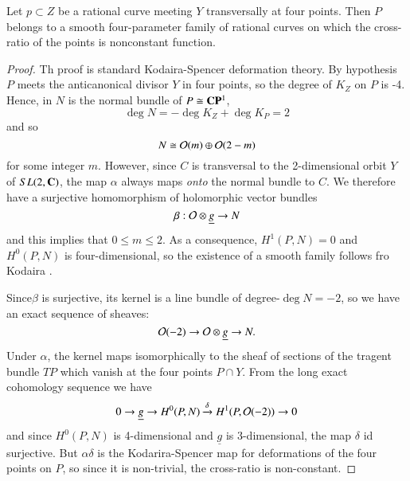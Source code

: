 \begin{proposition}\label{chap7-proposition-3}
Let $p \subset Z$ be a rational curve meeting $Y$ transversally at four points. Then $P$ belongs to a smooth four-parameter family of rational curves on which the cross-ratio of the points is nonconstant function.
\end{proposition}

\begin{proof}
Th proof is standard Kodaira-Spencer deformation theory. By hypothesis $P$ meets the anticanonical divisor $Y$ in four points, so the degree of $K_{Z}$ on $P$ is -4. Hence, in $N$ is the normal bundle of $P \cong \mathbf{C}\mathbf{P}^{1}$,
$$
\deg N = -\deg K_{Z} + \deg K_{P} = 2
$$
and so
$$
N \cong \mathcal{O}(m) \oplus \mathcal{O}(2-m)
$$
for some integer $m$. However, since $C$ is transversal to the 2-dimensional orbit $Y$ of $SL(2, \mathbf{C})$, the map $\alpha$ always maps \textit{onto} the normal bundle to $C$. We therefore have a surjective homomorphism of holomorphic vector bundles
$$
\beta : \mathcal{O} \otimes \underline{g} \rightarrow N
$$
and this implies that $ 0 \leq m \leq  2$. As a consequence, $H^{1} (P ,N) = 0$ and $H^{0}(P, N)$ is four-dimensional, so the existence of a smooth family follows fro  Kodaira \cite{chap7-key9}. 

Since\pageoriginale $\beta$ is surjective, its kernel is a line bundle of degree-$\deg N = -2$, so we have an exact sequence of sheaves:
$$
\mathcal{O}(-2)\rightarrow \mathcal{O} \otimes \underline{g}\rightarrow N.
$$
Under $\alpha$, the kernel maps isomorphically to the sheaf of sections of the tragent bundle $TP$ which vanish at the four points $P\cap Y$. From the long exact cohomology sequence we have
$$
0 \rightarrow \underline{g}\rightarrow H^{0}(P, N)\xrightarrow{\delta} H^{1}(P, \mathcal{O}(-2))\rightarrow 0
$$
and since $H^{0}(P, N)$ is 4-dimensional and $\underline{g}$ is 3-dimensional, the map $\delta$ id surjective. But $\alpha \delta$ is the Kodarira-Spencer map for deformations of the four points on $P$, so since it is non-trivial, the cross-ratio is non-constant.
\end{proof}

\medskip

